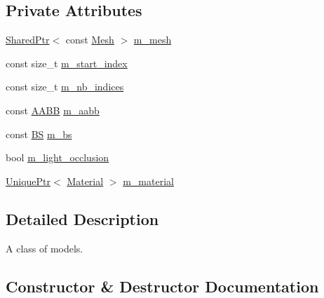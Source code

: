 \subsection*{Private Attributes}
\begin{DoxyCompactItemize}
\item 
\hyperlink{namespacemage_a1e01ae66713838a7a67d30e44c67703e}{Shared\+Ptr}$<$ const \hyperlink{classmage_1_1_mesh}{Mesh} $>$ \hyperlink{classmage_1_1_model_aecd2b4031c5df30fb5f7ed6d62810f73}{m\+\_\+mesh}
\item 
const size\+\_\+t \hyperlink{classmage_1_1_model_a63a3e697c9eb1606249de15cc7b818c3}{m\+\_\+start\+\_\+index}
\item 
const size\+\_\+t \hyperlink{classmage_1_1_model_a1fcf80ed9f3002bd2319ef83f073ae75}{m\+\_\+nb\+\_\+indices}
\item 
const \hyperlink{structmage_1_1_a_a_b_b}{A\+A\+BB} \hyperlink{classmage_1_1_model_ab53a0f253df545fd59723bee107bf523}{m\+\_\+aabb}
\item 
const \hyperlink{structmage_1_1_b_s}{BS} \hyperlink{classmage_1_1_model_a1d3ea0a9f302f623dcaceb2df4315a0b}{m\+\_\+bs}
\item 
bool \hyperlink{classmage_1_1_model_af6e1183a2f2147b7848aa10010bdfcd3}{m\+\_\+light\+\_\+occlusion}
\item 
\hyperlink{namespacemage_a3316d7143a973e37adf1110f2e80ca31}{Unique\+Ptr}$<$ \hyperlink{classmage_1_1_material}{Material} $>$ \hyperlink{classmage_1_1_model_a88d97cd87b7ef37130f7a4007477698a}{m\+\_\+material}
\end{DoxyCompactItemize}


\subsection{Detailed Description}
A class of models. 

\subsection{Constructor \& Destructor Documentation}
\hypertarget{classmage_1_1_model_a6f8f226a76be925e0fa2e9ed045fded2}{}\label{classmage_1_1_model_a6f8f226a76be925e0fa2e9ed045fded2} 

